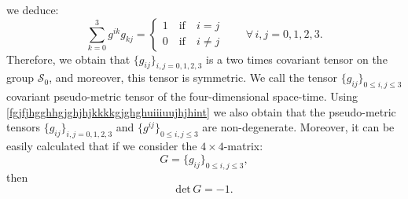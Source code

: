 \documentclass{article}
\theoremstyle{definition}
\theoremstyle{remark}
\renewcommand{\vec}[1]{\mathbf{#1}}
\newcommand{\er}{\eqref}
\newcommand{\er}{\eqref}
\begin{document}
%
%
%
\begin{comment}
\begin{equation*}
\sum_{k=0}^{3}g_{0k}g^{k0}=g_{00}g^{00}+\sum_{k=1}^{3}g_{0k}g^{k0}=
1-\frac{|\vec v|^2}{c^2}+\frac{|\vec v|^2}{c^2}=1,
\end{equation*}
\begin{equation*}
\sum_{k=0}^{3}g_{ik}g^{kj}=g_{i0}g^{0j}+\sum_{k=1}^{3}g_{ik}g^{kj}=
\frac{v_iv_j}{c^2}+\delta_{ij}-\frac{v_iv_j}{c^2}=\delta_{ij}\quad\forall
1\leq i,j\leq 3,
\end{equation*}
and
\begin{equation*}
\sum_{k=0}^{3}g_{ik}g^{k0}=g_{i0}g^{00}+\sum_{k=1}^{3}g_{ik}g^{k0}=\frac{v_i}{c}-\frac{v_i}{c}=0
\quad\forall 1\leq i\leq 3,
\end{equation*}
\begin{multline*}
\sum_{k=0}^{3}g_{0k}g^{kj}=g_{00}g^{0j}+\sum_{k=1}^{3}g_{0k}g^{kj}=
\left(1-\frac{|\vec v|^2}{c^2}\right)\frac{v_j}{c}
-\sum_{k=1}^{3}\frac{v_k}{c}\left(\delta_{kj}-\frac{v_kv_j}{c^2}\right)=0
\quad\forall 1\leq j\leq 3,
\end{multline*}
where $\{g^{ij}\}_{0\leq i,j\leq 3}$ is the contravariant
pseudo-metric tensor of the four-dimensional space-time, defined by
\er{hoyuiouigyfghgjh3478zzrrZZffGGjkkjint}. So,
\end{comment}
%
%
%
we deduce:
\begin{equation}\label{fgjfjhgghhgjghjhjkkkkgjghghuiiiuujhjhint}
\sum_{k=0}^{3}g^{ik}g_{kj}=\begin{cases}
1\quad\text{if}\quad i=j\\
0\quad\text{if}\quad i\neq j
\end{cases}\quad\quad\forall\, i,j=0,1,2,3.
\end{equation}
Therefore,
we obtain that $\{g_{ij}\}_{i,j=0,1,2,3}$ is a two times covariant
tensor on the group $\mathcal{S}_0$, and moreover, this tensor is
symmetric. We call the tensor $\{g_{ij}\}_{0\leq i,j\leq 3}$
covariant pseudo-metric tensor of the four-dimensional space-time.
Using \er{fgjfjhgghhgjghjhjkkkkgjghghuiiiuujhjhint} we also obtain
that the pseudo-metric tensors $\{g_{ij}\}_{i,j=0,1,2,3}$ and
$\{g^{ij}\}_{0\leq i,j\leq 3}$ are non-degenerate.
Moreover, it can be easily calculated that if
we consider the $4\times 4$-matrix:
\begin{equation}\label{fgjfjhgghhgjghjhjkkkkgjghghuiiiuujhjhjkljint}
G=\{g_{ij}\}_{0\leq i,j\leq 3},
\end{equation}
then
\begin{equation}\label{fgjfjhgghhgjghjhjkkkkgjghghuiiiuujhjh1int}
\text{det}\,G=-1.
\end{equation}
\end{document}
